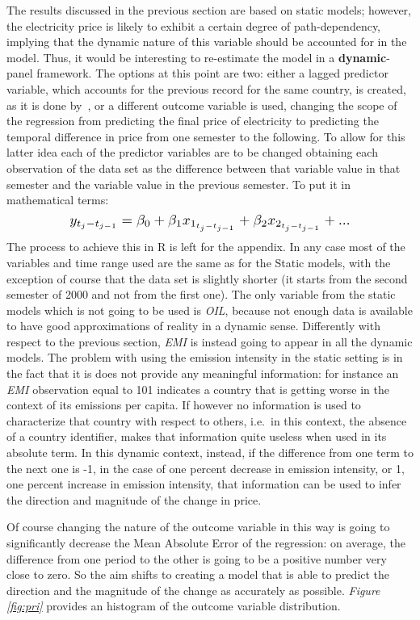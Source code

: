 \documentclass[a4paper,12pt]{book}
\begin{document}
The results discussed in the previous section are based on static models; however, the electricity price is likely to exhibit a certain degree of path-dependency, implying that the dynamic nature of this variable should be accounted for in the model. Thus, it would be interesting to re-estimate the model in a \textbf{dynamic}-panel framework. The options at this point are two: either a lagged predictor variable, which accounts for the previous record for the same country, is created, as it is done by~\cite{hyland2016restructuring}, or a different outcome variable is used, changing the scope of the regression from predicting the final price of electricity to predicting the temporal difference in price from one semester to the following. To allow for this latter idea each of the predictor variables are to be changed obtaining each observation of the data set as the difference between that variable value in that semester and the variable value in the previous semester. To put it in mathematical terms: $$ \scalebox{1.25}{$y_{t_j-t_{j-1}} = \beta_0 + \beta_1 x_{1_{t_j - t_{j-1}}} + \beta_2 x_{2_{t_j - t_{j-1}}} + ...$}$$ The process to achieve this in R is left for the appendix. In any case most of the variables and time range used are the same as for the Static models, with the exception of course that the data set is slightly shorter (it starts from the second semester of 2000 and not from the first one). The only variable from the static models which is not going to be used is \textit{OIL}, because not enough data is available to have good approximations of reality in a dynamic sense. Differently with respect to the previous section, \textit{EMI} is instead going to appear in all the dynamic models. The problem with using the emission intensity in the static setting is in the fact that it is does not provide any meaningful information: for instance an \textit{EMI} observation equal to 101 indicates a country that is getting worse in the context of its emissions per capita. If however no information is used to characterize that country with respect to others, i.e.\ in this context, the absence of a country identifier, makes that information quite useless when used in its absolute term. In this dynamic context, instead, if the difference from one term to the next one is -1, in the case of one percent decrease in emission intensity, or 1, one percent increase in emission intensity, that information can be used to infer the direction and magnitude of the change in price.

Of course changing the nature of the outcome variable in this way is going to significantly decrease the Mean Absolute Error of the regression: on average, the difference from one period to the other is going to be a positive number very close to zero. So the aim shifts to creating a model that is able to predict the direction and the magnitude of the change as accurately as possible. \textit{Figure \ref{fig:pri}} provides an histogram of the outcome variable distribution.
\end{document}
